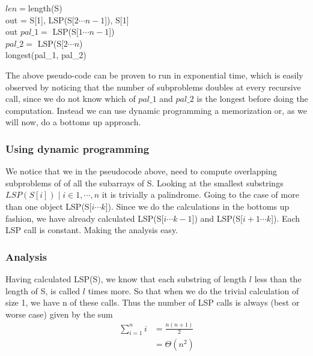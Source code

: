 \documentclass[11pt,english]{article}
\begin{document}
\begin{algorithm}
	
	\BlankLine
	
	$len = $length(S) \\
	{   
	    out = S[1], LSP(S[$2 \cdots n-1$]), S[1] \\
		\Return out
	}	
	$pal\_1 =$ LSP(S[$1 \cdots n-1$]) \\
	$pal\_2 =$ LSP(S[$2 \cdots n$) \\
	\Return longest(pal\_1, pal\_2)
\end{algorithm}

\noindent
The above pseudo-code can be proven to run in exponential time, which is easily observed by noticing that the number of subproblems doubles at every recursive call, since we do not know which of $pal\_1$ and $pal\_2$ is the longest before doing the computation. Instead we can use dynamic programming a memorization or, as we will now, do a bottoms up approach.

\subsubsection*{Using dynamic programming}

We notice that we in the pseudocode above, need to compute overlapping subproblems of of all the subarrays of S. Looking at the smallest substrings $LSP(S[i]) \mid i \in {1,\cdots, n}$ it is trivially a palindrome. Going to the case of more than one object LSP(S[$i \cdots k$]). Since we do the calculations in the bottoms up fashion, we have already calculated LSP(S[$i \cdots k-1$]) and LSP(S[$i+1 \cdots k$]). Each LSP call is constant. Making the analysis easy.

\subsubsection*{Analysis}

Having calculated LSP(S), we know that each substring of length $l$ less than the length of S, is called $l$ times more. So that when we do the trivial calculation of size 1, we have n of these calls. Thus the number of LSP calls is always (best or worse case) given by the sum
\begin{align*}
\sum_{i = 1}^n i &= \frac{n(n+1)}{2} \\
&= \Theta(n^2)
\end{align*}







\end{document}

